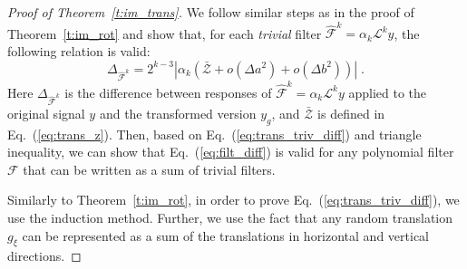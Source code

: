 \documentclass[10pt,journal,compsoc]{IEEEtran}
\newcommand{\mF}{\mathcal{F}}
\newcommand{\hmF}{\hat{\mathcal{F}}}
\newcommand{\norm}[1]{\left|#1\right|}
\begin{document}
	\begin{proof}[Proof of Theorem~\ref{t:im_trans}]
		We follow similar steps as in the proof of Theorem~\ref{t:im_rot} and show that, for each \emph{trivial} filter $\hmF^k = \alpha_k \mathcal{L}^k y$, the following relation is valid:
		\begin{equation}
		\Delta_{\hmF^k} = 2^{k-3} \norm{\alpha_k (\bar{\mathcal{Z}} + o(\Delta a^2) + o(\Delta b^2))} \;.
		\label{eq:trans_triv_diff}
		\end{equation}
		\noindent
		Here $\Delta_{\hmF^k}$ is the difference between responses of $\hmF^k = \alpha_k \mathcal{L}^k y$ applied to the original signal $y$ and the transformed version $y_g$, and $\bar{\mathcal{Z}}$ is defined in Eq.~(\ref{eq:trans_z}). Then, based on Eq.~(\ref{eq:trans_triv_diff}) and triangle inequality, we can show that Eq.~(\ref{eq:filt_diff}) is valid for any polynomial filter $\mF$  that can be written as a sum of trivial filters.

		Similarly to Theorem~\ref{t:im_rot}, in order to prove Eq.~(\ref{eq:trans_triv_diff}), we use the induction method. Further, we use the fact that any random translation $g_\xi$ can be represented as a sum of the translations in horizontal and vertical directions.%


\end{proof}
\end{document}
